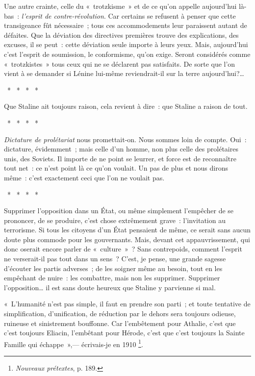 \documentclass[french,twoside]{book} %
\newcommand\chapterclose{} %
\begin{document}
Une autre crainte, celle du « trotzkisme » et de ce qu’on appelle aujourd’hui là-bas : \emph{l’esprit de contre-révolution}. Car certains se refusent à penser que cette transigeance fût nécessaire ; tous ces accommodements leur paraissent autant de défaites. Que la déviation des directives premières trouve des explications, des excuses, il se peut : cette déviation seule importe à leurs yeux. Mais, aujourd’hui c’est l’esprit de soumission, le conformisme, qu’on exige. Seront considérés comme « trotzkistes » tous ceux qui ne se déclarent pas satisfaits. De sorte que l’on vient à se demander si Lénine lui-même reviendrait-il sur la terre aujourd’hui?…\par
{\centering \noindent *  *  *  *  *\par}
\noindent Que Staline ait toujours raison, cela revient à dire : que Staline a raison de tout.\par
{\centering \noindent *  *  *  *  *\par}
\noindent \emph{Dictature de prolétariat} nous promettait-on. Nous sommes loin de compte. Oui : dictature, évidemment ; mais celle d’un homme, non plus celle des prolétaires unis, des Soviets. Il importe de ne point se leurrer, et force est de reconnaître tout net : ce n’est point là ce qu’on voulait. Un pas de plus et nous dirons même : c’est exactement ceci que l’on ne voulait pas.\par
{\centering \noindent *  *  *  *  *\par}
\noindent Supprimer l’opposition dans un État, ou même simplement l’empêcher de se prononcer, de se produire, c’est chose extrêmement grave : l’invitation au terrorisme. Si tous les citoyens d’un État pensaient de même, ce serait sans aucun doute plus commode pour les gouvernants. Mais, devant cet appauvrissement, qui donc oserait encore parler de « culture » ? Sans contrepoids, comment l’esprit ne verserait-il pas tout dans un sens ? C’est, je pense, une grande sagesse d’écouter les partis adverses ; de les soigner même au besoin, tout en les empêchant de nuire : les combattre, mais non les supprimer. Supprimer l’opposition… il est sans doute heureux que Staline y parvienne si mal.\par
« L’humanité n’est pas simple, il faut en prendre son parti ; et toute tentative de simplification, d’unification, de réduction par le dehors sera toujours odieuse, ruineuse et sinistrement bouffonne. Car l’embêtement pour Athalie, c’est que c’est toujours Eliacin, l’embêtant pour Hérode, c’est que c’est toujours la Sainte Famille qui échappe »,— écrivais-je en 1910 \footnote{\emph{Nouveaux prétextes}, p. 189.}.
\chapterclose
\end{document}
